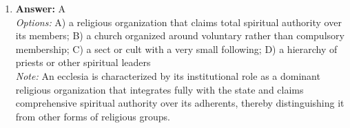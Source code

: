 \documentclass[12pt]{article}
\begin{document}
\begin{enumerate}[label=\arabic*.]
\\ \textit{Options:} A) the white population did not believe in liberty, equality, and democracy; B) they wanted to retain a strong sense of their original ethnic identity; C) they were not prepared to leave the Southern states and move to North America; D) the promise of citizenship was contradicted by continued discrimination
\\ \textit{Note:} Warner and Myrdal argued that the persistent discrimination faced by black former slaves undermined the promise of citizenship, preventing their full integration into the 'ethnic melting pot' of North American cities.
\item \textbf{Answer:} A
\\ \textit{Options:} A) a religious organization that claims total spiritual authority over its members; B) a church organized around voluntary rather than compulsory membership; C) a sect or cult with a very small following; D) a hierarchy of priests or other spiritual leaders
\\ \textit{Note:} An ecclesia is characterized by its institutional role as a dominant religious organization that integrates fully with the state and claims comprehensive spiritual authority over its adherents, thereby distinguishing it from other forms of religious groups.
\end{enumerate}
\end{document}
